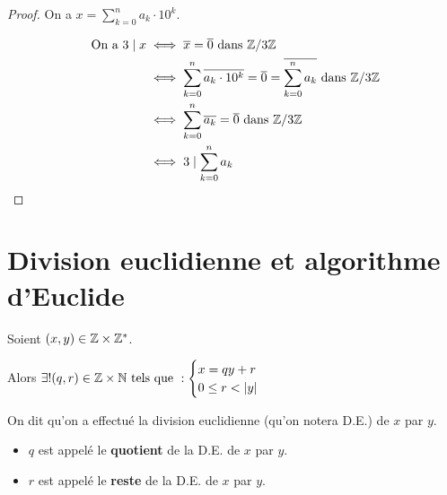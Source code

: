 \documentclass[12pt, a4paper]{report}
\begin{document}
\begin{proof}
    On a $x=\sum_{k=0}^{n}a_k\cdot 10^k$.

    \begin{align*}
        \text{ On a } 3\mid x &\iff \overline{x} = \overline{0} \text{ dans } \mathbb{Z}/3\mathbb{Z}\\
        &\iff \sum_{k=0}^{n}\overline{a_k \cdot 10^k} = \overline{0} = \overline{\sum_{k=0}^{n}a_k} \text{ dans } \mathbb{Z}/3\mathbb{Z}\\
        &\iff \sum_{k=0}^{n}\overline{a_k} = \overline{0} \text{ dans } \mathbb{Z}/3\mathbb{Z}\\
        &\iff 3 \mid \sum_{k=0}^{n}a_k
    \end{align*}
\end{proof}

\section{Division euclidienne et algorithme d'Euclide}

\begin{theorem}
    Soient $(x,y)\in\mathbb{Z}\times\mathbb{Z}^*$.

    Alors $\exists!(q,r)\in\mathbb{Z}\times\mathbb{N} \text{ tels que } : \begin{cases}
    x=qy+r\\
    0 \leq r < |y|
    \end{cases}$

    On dit qu'on a effectué la division euclidienne (qu'on notera D.E.) de $x$ par $y$.

    \begin{itemize}
        \item $q$ est appelé le \textbf{quotient} de la D.E. de $x$ par $y$.
        \item $r$ est appelé le \textbf{reste} de la D.E. de $x$ par $y$.
    \end{itemize}
    
\end{theorem}
\end{document}
